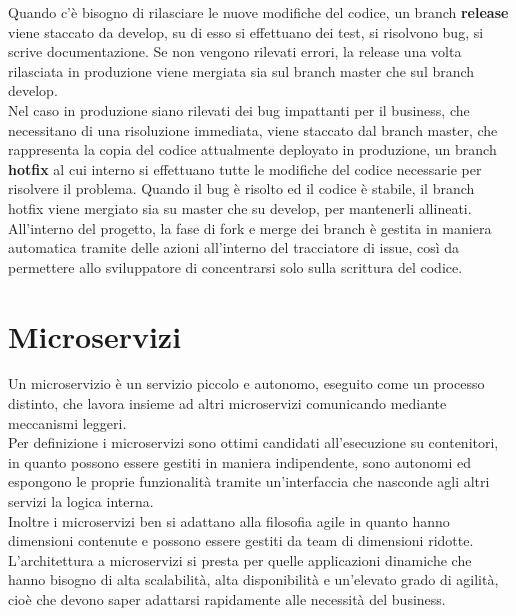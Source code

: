\documentclass[a4paper, 12pt]{report}
\numberwithin{equation}{section}
\begin{document}
Quando c’è bisogno di rilasciare le nuove modifiche del codice, un branch \textbf{release} viene staccato da develop, su di esso si effettuano dei test, si risolvono bug, si scrive documentazione. Se non vengono rilevati errori, la release una volta rilasciata in produzione viene mergiata sia sul branch master che sul branch develop.\\
Nel caso in produzione siano rilevati dei bug impattanti per il business, che necessitano di una risoluzione immediata, viene staccato dal branch master, che rappresenta la copia del codice attualmente deployato in produzione, un branch \textbf{hotfix} al cui interno si effettuano tutte le modifiche del codice necessarie per risolvere il problema. Quando il bug è risolto ed il codice è stabile, il branch hotfix viene mergiato sia su master che su develop, per mantenerli allineati.\\
All’interno del progetto, la fase di fork e merge dei branch è gestita in maniera automatica tramite delle azioni all’interno del tracciatore di issue, così da permettere allo sviluppatore di concentrarsi solo sulla scrittura del codice.

\section{Microservizi}
Un microservizio è un servizio piccolo e autonomo, eseguito come un processo distinto, che lavora insieme ad altri microservizi comunicando mediante meccanismi leggeri.\\
Per definizione i microservizi sono ottimi candidati all’esecuzione su contenitori, in quanto possono essere gestiti in maniera indipendente, sono autonomi ed espongono le proprie funzionalità tramite un’interfaccia che nasconde agli altri servizi la logica interna.\\
Inoltre i microservizi ben si adattano alla filosofia agile in quanto hanno dimensioni contenute e possono essere gestiti da team di dimensioni ridotte.\\
L’architettura a microservizi si presta per quelle applicazioni dinamiche che hanno bisogno di alta scalabilità, alta disponibilità e un’elevato grado di agilità, cioè che devono saper adattarsi rapidamente alle necessità del business.
\end{document}
